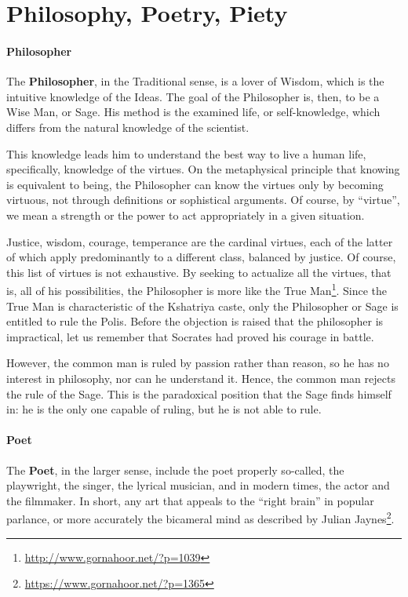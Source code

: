 \section{Philosophy, Poetry, Piety}

\paragraph{Philosopher}


The \textbf{Philosopher}, in the Traditional sense, is a lover of Wisdom, which is the intuitive knowledge of the Ideas. The goal of the Philosopher is, then, to be a Wise Man, or Sage. His method is the examined life, or self-knowledge, which differs from the natural knowledge of the scientist.

This knowledge leads him to understand the best way to live a human life, specifically, knowledge of the virtues. On the metaphysical principle that knowing is equivalent to being, the Philosopher can know the virtues only by becoming virtuous, not through definitions or sophistical arguments. Of course, by ``virtue'', we mean a strength or the power to act appropriately in a given situation.

Justice, wisdom, courage, temperance are the cardinal virtues, each of the latter of which apply predominantly to a different class, balanced by justice. Of course, this list of virtues is not exhaustive. By seeking to actualize all the virtues, that is, all of his possibilities, the Philosopher is more like the True Man\footnote{\url{http://www.gornahoor.net/?p=1039}}. Since the True Man is characteristic of the Kshatriya caste, only the Philosopher or Sage is entitled to rule the Polis. Before the objection is raised that the philosopher is impractical, let us remember that Socrates had proved his courage in battle.

However, the common man is ruled by passion rather than reason, so he has no interest in philosophy, nor can he understand it. Hence, the common man rejects the rule of the Sage. This is the paradoxical position that the Sage finds himself in: he is the only one capable of ruling, but he is not able to rule.

\paragraph{Poet}


The \textbf{Poet}, in the larger sense, include the poet properly so-called, the playwright, the singer, the lyrical musician, and in modern times, the actor and the filmmaker. In short, any art that appeals to the ``right brain'' in popular parlance, or more accurately the bicameral mind as described by Julian Jaynes\footnote{\url{https://www.gornahoor.net/?p=1365}}.

